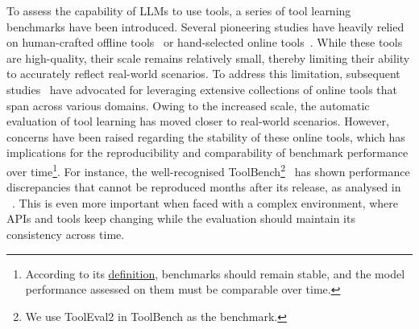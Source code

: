 To assess the capability of LLMs to use tools, a series of tool learning benchmarks have been introduced. 
Several pioneering studies have heavily relied on human-crafted offline tools~\cite{gpt4tools, xu2023tool} or hand-selected online tools~\cite{li2023api, li2023apibank, chen2023teval}.
While these tools are high-quality, their scale remains relatively small, thereby limiting their ability to accurately reflect real-world scenarios.
To address this limitation, subsequent studies~\citep{tang2023toolalpaca, ye2024tooleyes, qin2023tool} have advocated for leveraging extensive collections of online tools that span across various domains.
Owing to the increased scale, the automatic evaluation of tool learning has moved closer to real-world scenarios.
However, concerns have been raised regarding the stability of these online tools, which has implications for the reproducibility and comparability of benchmark performance over time\footnote{According to its \href{https://www.oed.com/dictionary/benchmark_n?tab=meaning_and_use}{definition}, benchmarks should remain stable, and the model performance assessed on them must be comparable over time.}. 
For instance, the well-recognised ToolBench\footnote{We use  ToolEval2 in ToolBench as the benchmark.}~\cite{qin2023toolllm} has shown performance discrepancies that cannot be reproduced months after its release, as analysed in ~.
This is even more important when faced with a complex environment, where APIs and tools keep changing while the evaluation should maintain its consistency across time.

